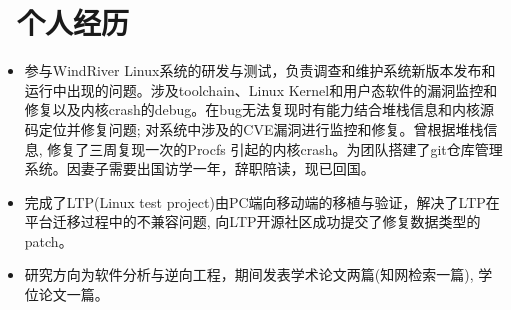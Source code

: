 \documentclass[10pt]{resume}
\begin{document}
\section{\faUsers\ 个人经历}\normalsize
{}
\begin{itemize}
\item {参与WindRiver Linux系统的研发与测试，负责调查和维护系统新版本发布和运行中出现的问题。涉及toolchain、Linux Kernel和用户态软件的漏洞监控和修复以及内核crash的debug。在bug无法复现时有能力结合堆栈信息和内核源码定位并修复问题; 对系统中涉及的CVE漏洞进行监控和修复。曾根据堆栈信息, 修复了三周复现一次的Procfs 引起的内核crash。为团队搭建了git仓库管理系统。因妻子需要出国访学一年，辞职陪读，现已回国。}
\end{itemize}
\begin{itemize}
\item {完成了LTP(Linux test project)由PC端向移动端的移植与验证，解决了LTP在平台迁移过程中的不兼容问题, 向LTP开源社区成功提交了修复数据类型的patch。}
\end{itemize}
\begin{itemize}
\item {研究方向为软件分析与逆向工程，期间发表学术论文两篇(知网检索一篇), 学位论文一篇。}
\end{itemize}

\end{document}
